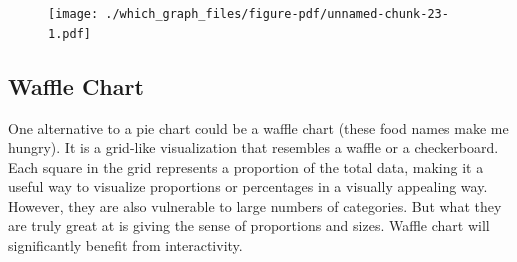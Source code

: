 \documentclass[
  letterpaper,
]{book}
\begin{document}
\begin{figure}[H]

{\centering \texttt{[image: ./which\_graph\_files/figure-pdf/unnamed-chunk-23-1.pdf]}

}

\end{figure}

\hypertarget{waffle-chart}{%
\subsection{Waffle Chart}\label{waffle-chart}}

One alternative to a pie chart could be a waffle chart (these food names
make me hungry). It is a grid-like visualization that resembles a waffle
or a checkerboard. Each square in the grid represents a proportion of
the total data, making it a useful way to visualize proportions or
percentages in a visually appealing way. However, they are also
vulnerable to large numbers of categories. But what they are truly great
at is giving the sense of proportions and sizes. Waffle chart will
significantly benefit from interactivity.
\end{document}
